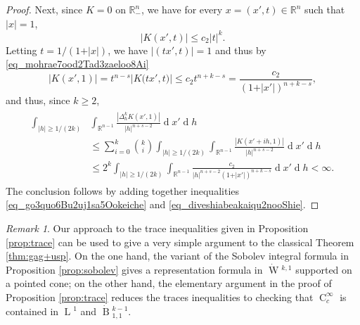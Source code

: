 \documentclass[a4paper,10pt]{amsart}
\newcommand{\R}{\mathbb R}
\renewcommand{\leq}{\leqslant}
\newcommand{\dif}{\mathrm{d}}
\renewcommand{\dif}{\operatorname{d}\!}
\newcommand{\lebe}{\operatorname{L}}
\newcommand{\sobo}{\operatorname{W}}
\newcommand{\hold}{\operatorname{C}}
\newcommand{\besov}{\operatorname{B}}
\numberwithin{equation}{section}
\theoremstyle{remark}
\newtheorem{remark}[theorem]{Remark}
\numberwithin{equation}{section}
\begin{document}
\begin{proof}
		Next, since \(K = 0\) on \(\R^n_-\), we have for every \(x=(x',t)  \in \R^n\) such that \(\vert x \vert = 1\), 
		\begin{equation}
			\label{eq_mohrae7ood2Tad3zaeloo8Ai}
			\vert K (x',t)\vert \leq c_2 |t|^k.
		\end{equation}
		Letting \(t = 1/({1 + \vert x\vert})\), we have \(\vert(t x', t)\vert = 1\) and thus by \eqref{eq_mohrae7ood2Tad3zaeloo8Ai}
		\begin{equation*}
			\vert K (x', 1)\vert = t^{n - s} \vert K \bigl(tx', t \bigr)\vert
			\leq c_2 t^{n+k-s} = \frac{c_2}{(1 + \vert x'\vert)^{n+k-s}},
		\end{equation*}
		and thus, since \(k \ge 2\),  
		\begin{align}
			\begin{split}
				\label{eq_diveshiabeakaiqu2nooShie}
				\int_{\vert h \vert \ge 1/(2k)} &\int_{\R^{n-1}}
				\frac{|\Delta^k_h K(x',1)|}{|h|^{n+s-2}} \dif x'\dif h\\
				& \leq \sum_{i = 0}^k \binom{k}{i} \int_{\vert h \vert \ge 1/(2k)} \int_{\R^{n-1}}
				\frac{|K(x' + ih,1)|}{|h|^{n+s-2}}\dif x'\dif h \\
				& \leq 2^k \int_{\vert h \vert \ge 1/(2k)} \int_{\R^{n-1}}
				\frac{c_2}{|h|^{n + s - 2}(1 + \vert x'\vert)^{n+k-s}} \dif x'\dif h <\infty.
			\end{split}
		\end{align}
		The conclusion follows by adding together inequalities \eqref{eq_go3quo6Bu2uj1sa5Ookeiche} and \eqref{eq_diveshiabeakaiqu2nooShie}.
	\end{proof}
	\begin{remark}
		Our approach to the trace inequalities given in Proposition \ref{prop:trace} can be used to give a very simple argument to the classical Theorem \ref{thm:gag+usp}. On the one hand, the variant of the Sobolev integral formula in Proposition \ref{prop:sobolev} gives a representation formula in ${\dot{\sobo}}{^{k,1}}$ supported on a pointed cone; on the other hand, the elementary argument in the proof of Proposition \ref{prop:trace} reduces the traces inequalities to checking that $\hold_c^\infty$ is contained in ${\lebe}{^1}$ and ${\dot{\besov}}{^{k-1}_{1,1}}$.
	\end{remark}
	
	
	
\end{document}
